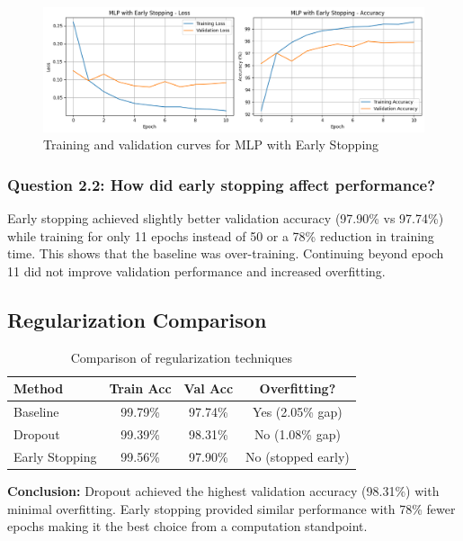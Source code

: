\begin{figure}[h]
    \centering
    \includegraphics[width=0.7\linewidth]{section2/early_stopping.png}
    \caption{Training and validation curves for MLP with Early Stopping}
    \label{fig:early-stopping}
\end{figure}

\subsubsection{Question 2.2: How did early stopping affect performance?}
Early stopping achieved slightly better validation accuracy (97.90\% vs 97.74\%) while training for only 11 epochs instead of 50 or a 78\% reduction in training time. This shows that the baseline was over-training. Continuing beyond epoch 11 did not improve validation performance and increased overfitting.

\subsection{Regularization Comparison}

\begin{table}[h]
\centering
\begin{tabular}{|l|c|c|c|}
\hline
\textbf{Method} & \textbf{Train Acc} & \textbf{Val Acc} & \textbf{Overfitting?} \\ \hline
Baseline & 99.79\% & 97.74\% & Yes (2.05\% gap) \\ \hline
Dropout & 99.39\% & 98.31\% & No (1.08\% gap) \\ \hline
Early Stopping & 99.56\% & 97.90\% & No (stopped early) \\ \hline
\end{tabular}
\caption{Comparison of regularization techniques}
\label{tab:regularization}
\end{table}

\textbf{Conclusion:} Dropout achieved the highest validation accuracy (98.31\%) with minimal overfitting. Early stopping provided similar performance with 78\% fewer epochs making it the best choice from a computation standpoint.